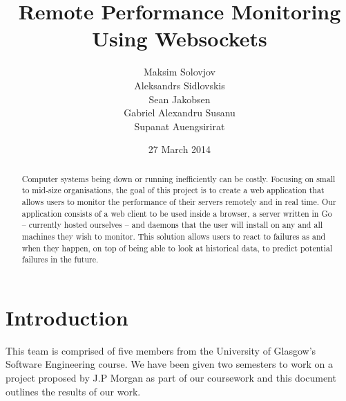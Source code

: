 \documentclass{l3proj}
\begin{document}
\title{Remote Performance Monitoring Using Websockets}
\author{Maksim Solovjov \\
        Aleksandrs Sidlovskis \\
        Sean Jakobsen \\
        Gabriel Alexandru Susanu \\
        Supanat Auengsirirat}
\date{27 March 2014}
\maketitle


\begin{abstract}

Computer systems being down or running inefficiently can be costly. Focusing on small to mid-size organisations, the goal of this project is to create a web application that allows users to monitor the performance of their servers remotely and in real time. Our application consists of a web client to be used inside a browser, a server written in Go -- currently hosted ourselves -- and daemons that the user will install on any and all machines they wish to monitor. This solution allows users to react to failures as and when they happen, on top of being able to look at historical data, to predict potential failures in the future.

\end{abstract}

\educationalconsent
\tableofcontents



\chapter{Introduction}
\label{intro}


This team is comprised of five members from the University of Glasgow's Software Engineering course. We have been given two semesters to work on a project proposed by J.P Morgan as part of our coursework and this document outlines the results of our work.

\end{document}
